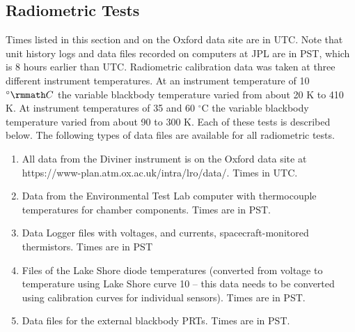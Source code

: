 \subsection{Radiometric Tests}
Times listed in this section and on the Oxford data site are in UTC.
Note that unit history logs and data files recorded on computers at JPL are in PST, which is 8 hours earlier than UTC.
Radiometric calibration data was taken at three different instrument temperatures.
At an instrument temperature of 10 $^\circ \rmmath C$ the variable blackbody temperature varied from about 20 K to 410 K.
At instrument temperatures of 35 and 60 $^\circ$C the variable blackbody temperature varied from about 90 to 300 K.
Each of these tests is described below.
The following types of data files are available for all radiometric tests.

\begin{enumerate}
\item All data from the Diviner instrument is on the Oxford data site at https://www-plan.atm.ox.ac.uk/intra/lro/data/. Times in UTC.
\item Data from the Environmental Test Lab computer with thermocouple temperatures for chamber components. Times are in PST.
\item Data Logger files with voltages, and currents, spacecraft-monitored thermistors. Times are in PST
\item Files of the Lake Shore diode temperatures (converted from voltage to temperature using Lake Shore curve 10 – this data needs to be converted using calibration curves for individual sensors). Times are in PST.
\item Data files for the external blackbody PRTs. Times are in PST.
\end{enumerate}


